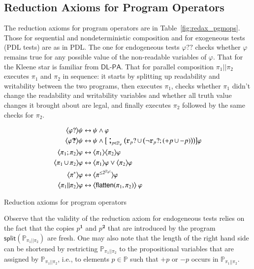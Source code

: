 \documentclass{llncs}
\newcommand{\progsplit}{\mathsf{split}}
\newcommand{\progFlatten}{\mathsf{flatten}}
\newcommand{\atm}{x}
\newcommand{\cp}[2]{{#2}^\mathbf{#1}}
\newcommand{\pll}{ {||} }							%
\newcommand{\readable}[1]{\mathtt{r}_{#1}}
\newcommand{\testendo}{?\!\!?}			%
\newcommand{\testpdl}{?}				%
\newcommand{\Dlpa}{\ensuremath{\mathsf{DL\text{-}PA}}\xspace}
\newcommand{\assgntopV}[1]{{\mathtt {+} #1}}
\newcommand{\assgnbotV}[1]{{\mathtt {-} #1}}
\newcommand{\card}[1]{|#1|}
\newcommand{\lbox}[1]{ \big[ #1 \big] }
\newcommand{\ldia}[1]{ \big\langle #1 \big\rangle}
\newcommand{\leqv}{ \leftrightarrow }
\newcommand{\ndet}{\,{\cup}\,}
\renewcommand{\phi}{\varphi}
\newcommand{\propset}{\mathbb P}
\newcommand{\propsetOf}[1]{\propset_{#1}}
\newcommand{\seqseq}[1]{ \text{\Large ;}_{#1} ~ }
\begin{document}
\subsection{Reduction Axioms for Program Operators}\label{sec:redax_pgmop} 

The reduction axioms for program operators are in Table~\ref{fig:redax_pgmops}.
Those for sequential and nondeterministic composition and for exogeneous tests (PDL tests) are as in PDL. 
The one for endogeneous tests $ \phi \testendo$ 
checks whether $\phi$ remains true for any possible value of the non-readable variables of $\phi$. 
That for the Kleene star is familiar from \Dlpa. 
That for parallel composition $\pi_1 \pll \pi_2$ executes $\pi_1$ and $\pi_2$ in sequence:
it starts by splitting up readability and writability between the two programs,
then executes $\pi_1$, checks whether $\pi_1$ didn't change the readability and writability variables
and whether all truth value changes it brought about are legal, 
and finally executes $\pi_2$ followed by the same checks for $\pi_2$.

\begin{table}[t]
\begin{align*}
\ldia{\phi \testpdl } \psi \leqv &\ \psi \land \phi
\\
\ldia{\phi \testendo } \psi \leqv &\ \psi \land \lbox{ ~ \seqseq{p \in \propsetOf \phi} \big(
\readable{p} \testpdl \ndet \big( \lnot \readable{p} \testpdl ; (\assgntopV{p} \ndet \assgnbotV{p}) \big) 
\big) } \phi
\\
\ldia{\pi_1 ; \pi_2}  \phi \leqv &\ \ldia{\pi_1 } \ldia{\pi_2}  \phi 
\\
\ldia{\pi_1 \ndet \pi_2}  \phi \leqv &\ \ldia{\pi_1 } \phi \lor \ldia{\pi_2}  \phi 
\\
\ldia{\pi^\ast}  \phi \leqv &\ \ldia{\pi^{\leq 2^{\card{\propsetOf{\phi}}}} }  \phi   
\\
\ldia{\pi_1 \pll \pi_2}  \phi \leqv &\ \ldia{ \progFlatten(\pi_1, \pi_2) } ~ \phi 
\end{align*}
\caption{Reduction axioms for program operators
\label{fig:redax_pgmops}
}
\end{table}

Observe that the validity of the reduction axiom for endogeneous tests relies on the fact that the copies  
$\cp 1 p$ and $\cp 2 p$ that are introduced by the program 
$\progsplit( \propsetOf{\pi_1 \pll \pi_2} ) $ are fresh. 
%
%
One may also note that the length of the right hand side can be shortened by restricting 
$\propsetOf{\pi_1 \pll \pi_2}$ to the propositional variables that are assigned by $\propsetOf{\pi_1 \pll \pi_2}$, i.e., 
to elements $p \in \propset$ such that $\assgntopV p$ or $\assgnbotV p$ occurs in $\propsetOf{\pi_1 \pll \pi_2}$.
\end{document}
